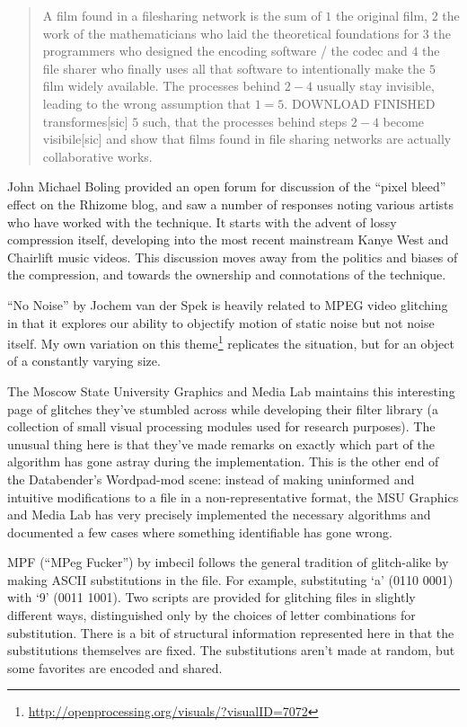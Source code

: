 \documentclass{thesis}
\begin{document}
	\begin{quote}
	A film found in a filesharing network is the sum of $1$ the original film, $2$ the work of the mathematicians who laid the theoretical foundations for $3$ the programmers who designed the encoding software / the codec and $4$ the file sharer who finally uses all that software to intentionally make the $5$ film widely available. The processes behind $2-4$ usually stay invisible, leading to the wrong assumption that $1=5$. DOWNLOAD FINISHED transformes[sic] $5$ such, that the processes behind steps $2-4$ become visibile[sic] and show that films found in file sharing networks are actually collaborative works.
	\end{quote}
	
	John Michael Boling provided an open forum for discussion of the ``pixel bleed'' effect on the Rhizome blog\cite{john_michael_boling_rhizome_????}, and saw a number of responses noting various artists who have worked with the technique. It starts with the advent of lossy compression itself, developing into the most recent mainstream Kanye West and Chairlift music videos. This discussion moves away from the politics and biases of the compression, and towards the ownership and connotations of the technique.
	
	``No Noise'' by Jochem van der Spek\cite{jochem_van_der_spek_no_2001} is heavily related to MPEG video glitching in that it explores our ability to objectify motion of static noise but not noise itself. My own variation on this theme\footnote{\url{http://openprocessing.org/visuals/?visualID=7072}} replicates the situation, but for an object of a constantly varying size.
	
	The Moscow State University Graphics and Media Lab maintains this interesting page of glitches\cite{nikolai_trunichkin_and_dr._dmitriy_vatolin_crazy_????} they've stumbled across while developing their filter library (a collection of small visual processing modules used for research purposes). The unusual thing here is that they've made remarks on exactly which part of the algorithm has gone astray during the implementation. This is the other end of the Databender's Wordpad-mod scene: instead of making uninformed and intuitive modifications to a file in a non-representative format, the MSU Graphics and Media Lab has very precisely implemented the necessary algorithms and documented a few cases where something identifiable has gone wrong.
	
	MPF (``MPeg Fucker'') by imbecil\cite{imbecil_mpeg_2004} follows the general tradition of glitch-alike by making ASCII substitutions in the file. For example, substituting `a' (0110 0001) with `9' (0011 1001). Two scripts are provided for glitching files in slightly different ways, distinguished only by the choices of letter combinations for substitution. There is a bit of structural information represented here in that the substitutions themselves are fixed. The substitutions aren't made at random, but some favorites are encoded and shared.
	
\end{document}
